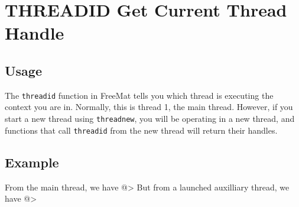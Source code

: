 \section{THREADID Get Current Thread Handle}

\subsection{Usage}

The \verb|threadid| function in FreeMat tells you which thread
is executing the context you are in.  Normally, this is thread
1, the main thread.  However, if you start a new thread using
\verb|threadnew|, you will be operating in a new thread, and functions
that call \verb|threadid| from the new thread will return their 
handles.
\subsection{Example}

From the main thread, we have
@>
But from a launched auxilliary thread, we have
@>
